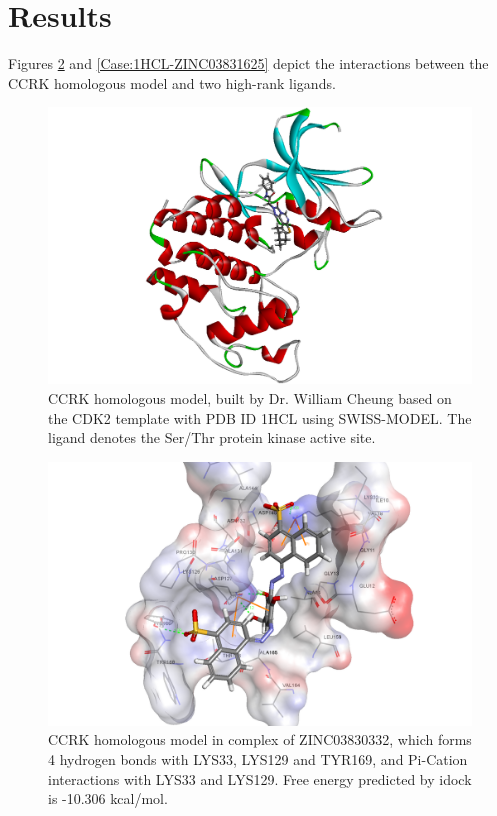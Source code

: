 \section{Results}

Figures \ref{Case:1HCL-ZINC03830332} and \ref{Case:1HCL-ZINC03831625} depict the interactions between the CCRK homologous model and two high-rank ligands.

\begin{figure}
\centering
\includegraphics[width=\linewidth]{../ccrk/CCRKHomologousModel.png}
\caption{CCRK homologous model, built by Dr. William Cheung based on the CDK2 template with PDB ID 1HCL \citep{1142} using SWISS-MODEL. The ligand denotes the Ser/Thr protein kinase active site.}
\label{Case:CCRKHomologousModel}
\end{figure}

\begin{figure}
\centering
\includegraphics[width=\linewidth]{../ccrk/1HCL-ZINC03830332.png}
\caption{CCRK homologous model in complex of ZINC03830332, which forms 4 hydrogen bonds with LYS33, LYS129 and TYR169, and Pi-Cation interactions with LYS33 and LYS129. Free energy predicted by idock is -10.306 kcal/mol.}
\label{Case:1HCL-ZINC03830332}
\end{figure}

